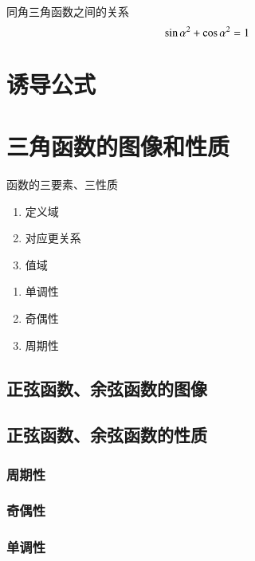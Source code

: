 \begin{conclusion}
\begin{definition}{同角三角函数之间的关系}
	\begin{equation}
		{\sin{\alpha}}^2 + {\cos{\alpha}}^2 = 1\\
		
	\end{equation}
\end{definition}

\section{诱导公式}



\section{三角函数的图像和性质}

\begin{remark}
函数的三要素、三性质
\begin{enumerate}
\item 定义域
\item 对应更关系
\item 值域
\end{enumerate}
\begin{enumerate}
\item 单调性
\item 奇偶性
\item 周期性
\end{enumerate}
\end{remark}

\subsection{正弦函数、余弦函数的图像}
\subsection{正弦函数、余弦函数的性质}
\subsubsection{周期性}
\subsubsection{奇偶性}
\subsubsection{单调性}


\end{conclusion}
